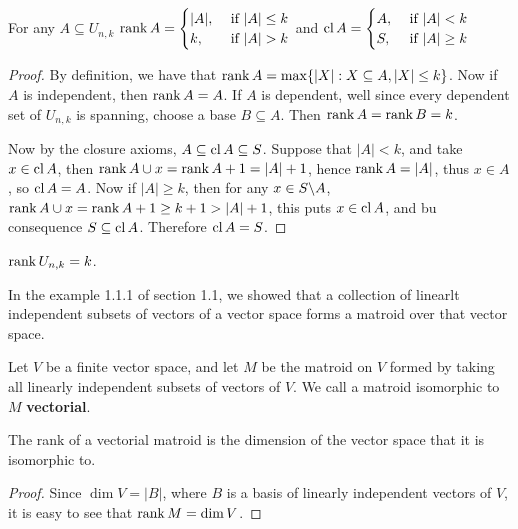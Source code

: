 \begin{corollary}
   For any $A \subseteq U_{n,k}$ $\rank{A}=\begin{cases}
                                        |A|, & \text{ if } |A| \leq k \\
                                        k, & \text{ if } |A|>k \\
                                    \end{cases}$
   and $\operatorname{cl}{A}=\begin{cases}
                    A, & \text{ if } |A|<k \\
                    S, & \text{ if } |A| \geq k \\
               \end{cases}$
\end{corollary}
\begin{proof}
    By definition, we have that $\operatorname{rank}{A}=\max\{|X|: X \subseteq A, |X|\leq k\}$. Now if $A$ is
    independent, then  $\operatorname{rank}{A}=A$. If $A$ is dependent, well since every dependent set of
    $U_{n,k}$ is spanning, choose a base $B \subseteq A$. Then  $\operatorname{rank}{A}=\operatorname{rank}{B}=k$.

    Now by the closure axioms,  $A \subseteq \operatorname{cl}{A} \subseteq S$. Suppose that $|A|<k$, and take  $x
    \in \operatorname{cl}{A}$, then $\operatorname{rank}{A \cup x}=\operatorname{rank}{A}+1=|A|+1$, hence $\operatorname{rank}{A}=|A|$, thus $x \in A$, so
$\operatorname{cl}{A}=A$. Now if $|A| \geq k$, then for any  $x \in S\backslash A$, $\operatorname{rank}{A \cup x}=\operatorname{rank}{A}+1 \geq
k+1>|A|+1$, this puts $x \in \operatorname{cl}{A}$, and bu consequence $S \subseteq \operatorname{cl}{A}$. Therefore $\operatorname{cl}{A}=S$.
\end{proof}
\begin{corollary}
    $\operatorname{rank}{U_{n,k}}=k$.
\end{corollary}

In the example 1.1.1 of section 1.1, we showed that a collection of linearlt independent subsets of
vectors of a vector space forms a matroid over that vector space.

\begin{definition}
    Let $V$ be a finite vector space, and let $M$ be the matroid on $V$ formed by taking all
    linearly independent subsets of vectors of $V$. We call a matroid isomorphic to $M$
    \textbf{vectorial}.
\end{definition}

\begin{proposition}\label{1.2.2}
    The rank of a vectorial matroid is the dimension of the vector space that it is isomorphic to.
\end{proposition}
\begin{proof}
    Since $\dim{V}=|B|$, where $B$ is a basis of linearly independent vectors of  $V$, it is easy to
    see that  $\operatorname{rank}{M}=\dim{V}$.
\end{proof}

